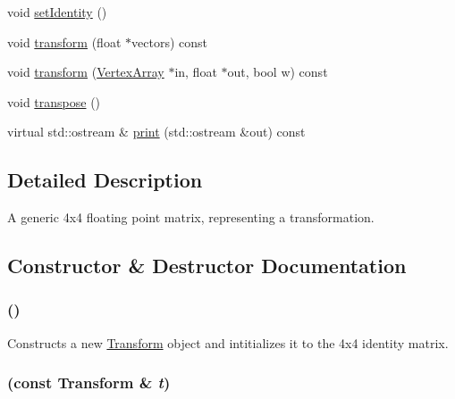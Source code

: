 \begin{CompactItemize}
void \hyperlink{classm3g_1_1Transform_382e6ad7e6721b121e510959e1011be3}{setIdentity} ()
\item 
void \hyperlink{classm3g_1_1Transform_0b85978885624f651df63da4137692df}{transform} (float $\ast$vectors) const 
\item 
void \hyperlink{classm3g_1_1Transform_557e326db393b8a1ce23455978af32dc}{transform} (\hyperlink{classm3g_1_1VertexArray}{VertexArray} $\ast$in, float $\ast$out, bool w) const 
\item 
void \hyperlink{classm3g_1_1Transform_f3a99ffb20127be48232d12260e934dc}{transpose} ()
\item 
virtual std::ostream \& \hyperlink{classm3g_1_1Transform_6fea17fa1532df3794f8cb39cb4f911f}{print} (std::ostream \&out) const 
\end{CompactItemize}


\subsection{Detailed Description}
A generic 4x4 floating point matrix, representing a transformation. 

\subsection{Constructor \& Destructor Documentation}
\hypertarget{classm3g_1_1Transform_9de68ec1c9b7809129814a3233ae4655}{
\subsubsection[{Transform}]{ ()}}
\label{classm3g_1_1Transform_9de68ec1c9b7809129814a3233ae4655}


Constructs a new \hyperlink{classm3g_1_1Transform}{Transform} object and intitializes it to the 4x4 identity matrix. \hypertarget{classm3g_1_1Transform_6f8c18ec2bd6b5c0d7f3472752ec79d1}{
\subsubsection[{Transform}]{ (const {\bf Transform} \& {\em t})}}
\label{classm3g_1_1Transform_6f8c18ec2bd6b5c0d7f3472752ec79d1}


